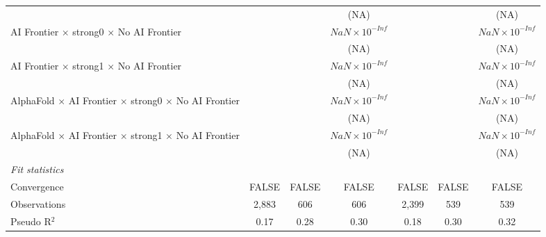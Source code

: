 \begin{tabular}{lcccccc}
                                                                              &                        &                        & (NA)                   &                        &          & (NA)\\   
   AI Frontier $\times$ strong0 $\times$ No AI Frontier                       &                        &                        & $NaN\times 10^{-Inf}$  &                        &          & $NaN\times 10^{-Inf}$\\    
                                                                              &                        &                        & (NA)                   &                        &          & (NA)\\   
   AI Frontier $\times$ strong1 $\times$ No AI Frontier                       &                        &                        & $NaN\times 10^{-Inf}$  &                        &          & $NaN\times 10^{-Inf}$\\    
                                                                              &                        &                        & (NA)                   &                        &          & (NA)\\   
   AlphaFold $\times$ AI Frontier $\times$ strong0 $\times$ No AI Frontier    &                        &                        & $NaN\times 10^{-Inf}$  &                        &          & $NaN\times 10^{-Inf}$\\    
                                                                              &                        &                        & (NA)                   &                        &          & (NA)\\   
   AlphaFold $\times$ AI Frontier $\times$ strong1 $\times$ No AI Frontier    &                        &                        & $NaN\times 10^{-Inf}$  &                        &          & $NaN\times 10^{-Inf}$\\    
                                                                              &                        &                        & (NA)                   &                        &          & (NA)\\   
   \midrule
   \emph{Fit statistics}\\
   Convergence                                                                &FALSE                   & FALSE                  & FALSE                  & FALSE                  & FALSE    & FALSE\\  
   Observations                                                               & 2,883                  & 606                    & 606                    & 2,399                  & 539      & 539\\  
   Pseudo R$^2$                                                               & 0.17                   & 0.28                   & 0.30                   & 0.18                   & 0.30     & 0.32\\  
   

\end{tabular}
